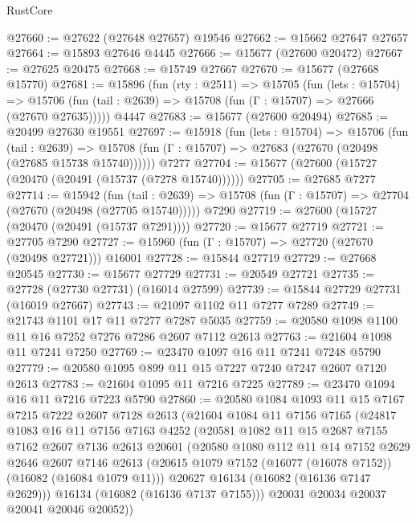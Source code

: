\begin{lexlean}{RustCore}
\begin{coremodule}
@27660 := @27622 (@27648 @27657) @19546
@27662 := @15662 @27647 @27657
@27664 := @15893 @27646 @4445
@27666 := @15677 (@27600 @20472)
@27667 := @27625 @20475
@27668 := @15749 @27667
@27670 := @15677 (@27668 @15770)
@27681 := @15896
    (fun (rty : @2511) =>
    @15705
      (fun (lets : @15704) =>
      @15706 (fun (tail : @2639) => @15708 (fun (Γ : @15707) => @27666 (@27670 @27635)))))
    @4447
@27683 := @15677 (@27600 @20494)
@27685 := @20499 @27630 @19551
@27697 := @15918
    (fun (lets : @15704) =>
    @15706
      (fun (tail : @2639) =>
      @15708 (fun (Γ : @15707) => @27683 (@27670 (@20498 (@27685 @15738 @15740))))))
    @7277
@27704 := @15677 (@27600 (@15727 (@20470 (@20491 (@15737 (@7278 @15740))))))
@27705 := @27685 @7277
@27714 := @15942
    (fun (tail : @2639) => @15708 (fun (Γ : @15707) => @27704 (@27670 (@20498 (@27705 @15740)))))
    @7290
@27719 := @27600 (@15727 (@20470 (@20491 (@15737 @7291))))
@27720 := @15677 @27719
@27721 := @27705 @7290
@27727 := @15960 (fun (Γ : @15707) => @27720 (@27670 (@20498 @27721))) @16001
@27728 := @15844 @27719
@27729 := @27668 @20545
@27730 := @15677 @27729
@27731 := @20549 @27721
@27735 := @27728 (@27730 @27731) (@16014 @27599)
@27739 := @15844 @27729 @27731 (@16019 @27667)
@27743 := @21097 @1102 @11 @7277 @7289
@27749 := @21743 @1101 @17 @11 @7277 @7287 @5035
@27759 := @20580 @1098 @1100 @11 @16 @7252 @7276 @7286 @2607 @7112 @2613
@27763 := @21604 @1098 @11 @7241 @7250
@27769 := @23470 @1097 @16 @11 @7241 @7248 @5790
@27779 := @20580 @1095 @899 @11 @15 @7227 @7240 @7247 @2607 @7120 @2613
@27783 := @21604 @1095 @11 @7216 @7225
@27789 := @23470 @1094 @16 @11 @7216 @7223 @5790
@27860 := @20580
    @1084
    @1093
    @11
    @15
    @7167
    @7215
    @7222
    @2607
    @7128
    @2613
    (@21604
      @1084
      @11
      @7156
      @7165
      (@24817
        @1083
        @16
        @11
        @7156
        @7163
        @4252
        (@20581
          @1082
          @11
          @15
          @2687
          @7155
          @7162
          @2607
          @7136
          @2613
          @20601
          (@20580
            @1080
            @112
            @11
            @14
            @7152
            @2629
            @2646
            @2607
            @7146
            @2613
            (@20615 @1079 @7152 (@16077 (@16078 @7152)) (@16082 (@16084 @1079 @11)))
            @20627
            @16134
            (@16082 (@16136 @7147 @2629)))
          @16134
          (@16082 (@16136 @7137 @7155)))
        @20031
        @20034
        @20037
        @20041
        @20046
        @20052))

\end{coremodule}
\end{lexlean}
